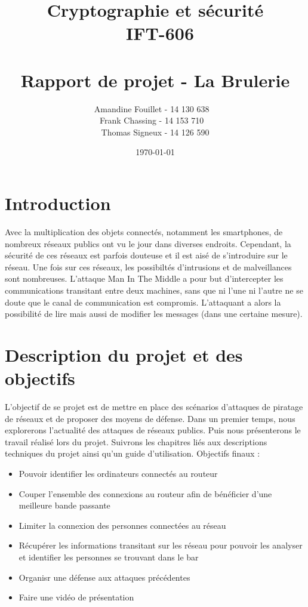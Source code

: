 \documentclass[11pt]{article}
\title{\vspace{\fill} Cryptographie et sécurité \\ ~\textbf{IFT-606} \\~\\ Rapport de projet - La Brulerie}
\author{Amandine Fouillet - 14 130 638  ~\\ Frank Chassing - 14 153 710 ~\\ Thomas Signeux - 14 126 590}
\date{\today \vspace{\fill}}
\begin{document}
\maketitle
\newpage \thispagestyle{empty}
\null
\newpage
\tableofcontents
\newpage
\section{Introduction}

Avec la multiplication des objets connectés, notamment les smartphones, de nombreux réseaux publics ont vu le jour dans diverses endroits. Cependant, la sécurité de ces réseaux est parfois douteuse et il est aisé de s’introduire sur le réseau. Une fois sur ces réseaux, les possibiltés d'intrusions et de malveillances sont nombreuses.
L’attaque Man In The Middle a pour but d’intercepter les communications transitant entre deux machines, sans que ni l’une ni l’autre ne se doute que le canal de communication est compromis.
L’attaquant a alors la possibilité de lire mais aussi de modifier les messages  (dans une certaine mesure).

\section{Description du projet et des objectifs}

L’objectif de se projet est de mettre en place des scénarios d’attaques de piratage de réseaux et de proposer des moyens de défense. Dans un premier temps, nous explorerons l'actualité des attaques de réseaux publics. Puis nous présenterons le travail réalisé lors du projet. Suivrons les chapitres liés aux descriptions techniques du projet ainsi qu'un guide d'utilisation.
Objectifs finaux :

\begin{itemize}
\item Pouvoir identifier les ordinateurs connectés au routeur
\item Couper l’ensemble des connexions au routeur afin de bénéficier d’une meilleure bande passante
\item Limiter la connexion des personnes connectées au réseau
\item Récupérer les informations transitant sur les réseau pour pouvoir les analyser et identifier les personnes se trouvant dans le bar
\item Organisr une défense aux attaques précédentes
\item Faire une vidéo de présentation 
\end{itemize}
\end{document}
